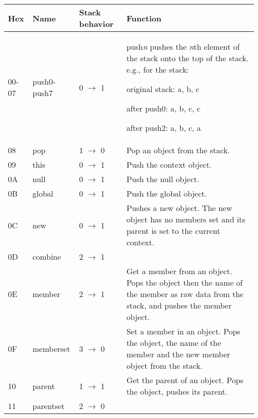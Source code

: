 \begin{longtable}{ | l | l | l | X | }
\hline
\textbf{Hex} & \textbf{Name} & \textbf{Stack behavior} & \textbf{Function} \\
\hline\hline
00-07 & push0-push7 & 0 $\rightarrow$ 1 & push\textit{n} pushes the \textit{n}th element of the stack onto the top of the stack. e.g., for the stack:

original stack: a, b, c

after push0: a, b, c, c

after push2: a, b, c, a \\
\hline
08 & pop & 1 $\rightarrow$ 0 & Pop an object from the stack. \\
\hline
09 & this & 0 $\rightarrow$ 1 & Push the context object. \\
\hline
0A & null & 0 $\rightarrow$ 1 & Push the null object. \\
\hline
0B & global & 0 $\rightarrow$ 1 & Push the global object. \\
\hline
0C & new & 0 $\rightarrow$ 1 & Pushes a new object. The new object has no members set and its parent is set to the current context. \\
\hline
0D & combine & 2 $\rightarrow$ 1 &  \\
\hline
0E & member & 2 $\rightarrow$ 1 & Get a member from an object. Pops the object then the name of the member as raw data from the stack, and pushes the member object. \\
\hline
0F & memberset & 3 $\rightarrow$ 0 & Set a member in an object. Pops the object, the name of the member and the new member object from the stack. \\
\hline
10 & parent & 1 $\rightarrow$ 1 & Get the parent of an object. Pops the object, pushes its parent. \\
\hline
11 & parentset & 

2 $\rightarrow$ 0 & 


\end{longtable}
